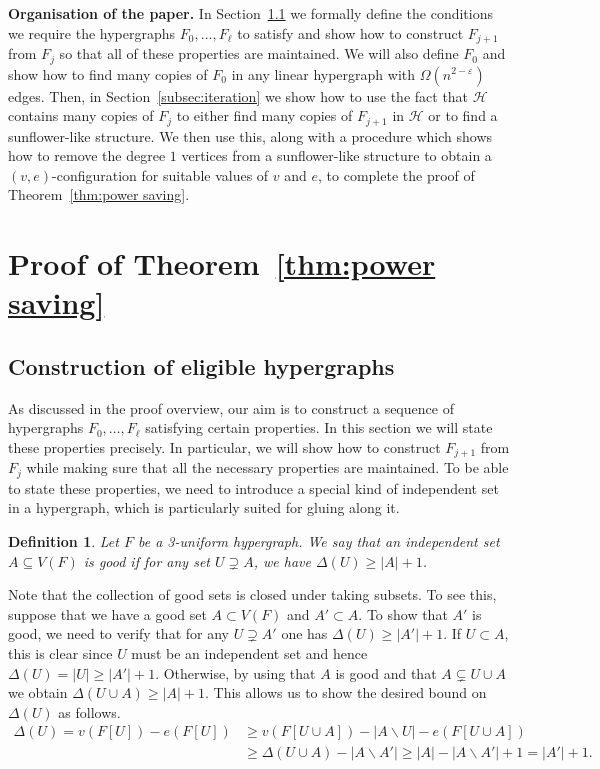 \documentclass{daj}
\def\eps{\varepsilon}
\def\cH{\mathcal{H}}
\theoremstyle{plain}
\newtheorem{definition}[theorem]{Definition}
\theoremstyle{remark}
\begin{document}
\textbf{Organisation of the paper.} In Section~\ref{subsec:construction of eligible hypergraphs} we formally define the conditions we require the hypergraphs $F_0, \dots, F_\ell$ to satisfy and show how to construct $F_{j+1}$ from $F_j$ so that all of these properties are maintained. We will also define $F_0$ and show how to find many copies of $F_0$ in any linear hypergraph with $\Omega(n^{2-\eps})$ edges. Then, in Section~\ref{subsec:iteration} we show how to use the fact that $\cH$ contains many copies of $F_j$ to either find many copies of $F_{j+1}$ in $\cH$ or to find a sunflower-like structure. We then use this, along with a procedure which shows how to remove the degree $1$ vertices from a sunflower-like structure to obtain a $(v, e)$-configuration for suitable values of $v$ and $e$, to complete the proof of Theorem~\ref{thm:power saving}.


\section{Proof of Theorem~\ref{thm:power saving}}

\subsection{Construction of eligible hypergraphs}\label{subsec:construction of eligible hypergraphs}

As discussed in the proof overview, our aim is to construct a sequence of hypergraphs $F_0, \dots, F_\ell$ satisfying certain properties. In this section we will state these properties precisely. In particular, we will show how to construct $F_{j+1}$ from $F_j$ while making sure that all the necessary properties are maintained. To be able to state these properties, we need to introduce a special kind of independent set in a hypergraph, which is particularly suited for gluing along it.

\begin{definition}\label{defn:good}
Let $F$ be a 3-uniform hypergraph. We say that an independent set $A\subseteq V(F)$ is \textit{good} if for any set $U\supsetneq A$, we have $\Delta(U)\geq |A|+1$.
\end{definition}

\noindent
Note that the collection of good sets is closed under taking subsets. To see this, suppose that we have a good set $A\subset V(F)$ and $A'\subset A$. To show that $A'$ is good, we need to verify that for any $U\supsetneq A'$ one has $\Delta(U)\geq |A'|+1$. If $U\subset A$, this is clear since $U$ must be an independent set and hence $\Delta(U)=|U|\geq |A'|+1$. Otherwise, by using that $A$ is good and that $A\subsetneq U\cup A$ we obtain $\Delta(U\cup A)\geq |A|+1$. This allows us to show the desired bound on $\Delta(U)$ as follows.
\begin{align*}
    \Delta(U)=v(F[U])-e(F[U])&\geq v(F[U\cup A])-|A\backslash U|-e(F[U\cup A])\\
    &\geq \Delta(U\cup A)-|A\backslash A'|\geq |A|-|A\backslash A'|+1=|A'|+1.
\end{align*}
\end{document}
